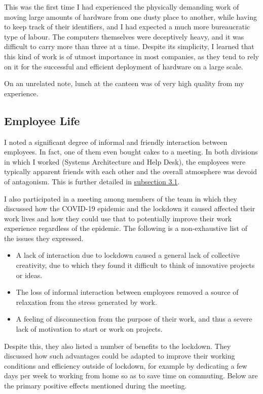 This was the first time I had experienced the physically demanding work of
moving large amounts of hardware from one dusty place to another, while having
to keep track of their identifiers, and I had expected a much more bureaucratic
type of labour. The computers themselves were deceptively heavy, and it was
difficult to carry more than three at a time. Despite its simplicity, I learned
that this kind of work is of utmost importance in most companies, as they tend
to rely on it for the successful and efficient deployment of hardware on a large
scale.

On an unrelated note, lunch at the canteen was of very high quality from my
experience.

\subsection{Employee Life}

I noted a significant degree of informal and friendly interaction between
employees. In fact, one of them even bought cakes to a meeting. In both
divisions in which I worked (Systems Architecture and Help Desk), the employees
were typically apparent friends with each other and the overall atmosphere was
devoid of antagonism. This is further detailed in
\hyperlink{subsection.3.1}{subsection 3.1}.

I also participated in a meeting among members of the team in which they
discussed how the COVID-19 epidemic and the lockdown it caused affected their
work lives and how they could use that to potentially improve their work
experience regardless of the epidemic. The following is a non-exhaustive list of
the issues they expressed.

\begin{itemize}
    \item A lack of interaction due to lockdown caused a general lack of
          collective creativity, due to which they found it difficult to think
          of innovative projects or ideas.
    \item The loss of informal interaction between employees removed a source of
          relaxation from the stress generated by work.
    \item A feeling of disconnection from the purpose of their work, and thus a
          severe lack of motivation to start or work on projects.
\end{itemize}

Despite this, they also listed a number of benefits to the lockdown. They
discussed how such advantages could be adapted to improve their working
conditions and efficiency outside of lockdown, for example by dedicating a few
days per week to working from home so as to save time on commuting. Below are
the primary positive effects mentioned during the meeting.

